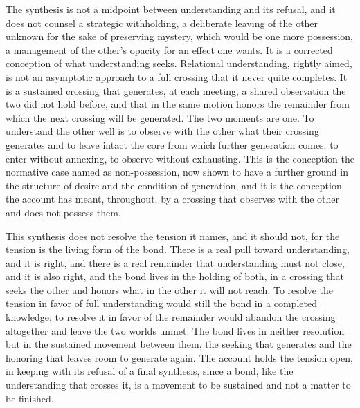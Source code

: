 The synthesis is not a midpoint between understanding and its refusal, and it does not counsel a strategic withholding, a deliberate leaving of the other unknown for the sake of preserving mystery, which would be one more possession, a management of the other's opacity for an effect one wants. It is a corrected conception of what understanding seeks. Relational understanding, rightly aimed, is not an asymptotic approach to a full crossing that it never quite completes. It is a sustained crossing that generates, at each meeting, a shared observation the two did not hold before, and that in the same motion honors the remainder from which the next crossing will be generated. The two moments are one. To understand the other well is to observe with the other what their crossing generates and to leave intact the core from which further generation comes, to enter without annexing, to observe without exhausting. This is the conception the normative case named as non-possession, now shown to have a further ground in the structure of desire and the condition of generation, and it is the conception the account has meant, throughout, by a crossing that observes with the other and does not possess them.

This synthesis does not resolve the tension it names, and it should not, for the tension is the living form of the bond. There is a real pull toward understanding, and it is right, and there is a real remainder that understanding must not close, and it is also right, and the bond lives in the holding of both, in a crossing that seeks the other and honors what in the other it will not reach. To resolve the tension in favor of full understanding would still the bond in a completed knowledge; to resolve it in favor of the remainder would abandon the crossing altogether and leave the two worlds unmet. The bond lives in neither resolution but in the sustained movement between them, the seeking that generates and the honoring that leaves room to generate again. The account holds the tension open, in keeping with its refusal of a final synthesis, since a bond, like the understanding that crosses it, is a movement to be sustained and not a matter to be finished.
